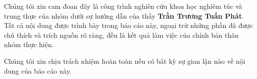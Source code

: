 Chúng tôi xin cam đoan đây là công trình nghiên cứu khoa học nghiêm túc và trung thực của nhóm dưới sự hướng dẫn của thầy \textbf{Trần Trương Tuấn Phát}. Tất cả nội dung được trình bày trong báo cáo này, ngoại trừ những phần đã được chú thích và trích nguồn rõ ràng, đều là kết quả làm việc của chính bản thân nhóm thực hiện.

\indent Chúng tôi xin chịu trách nhiệm hoàn toàn nếu có bất kỳ sự gian lận nào về nội dung của báo cáo này.
